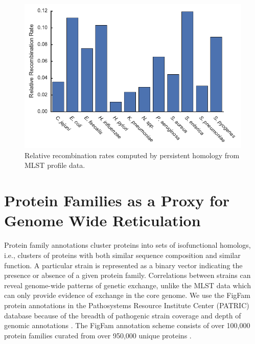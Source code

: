 \begin{figure}
\centering
\includegraphics[width=\textwidth]{./fig/pathogen_barchart.pdf}
\caption[Core genome reticulation patterns in pathogenic bacteria from MLST profiles]{Relative recombination rates computed by persistent homology from MLST profile data.}
\label{fig:pathogen_barchart}
\end{figure}

\section{Protein Families as a Proxy for Genome Wide Reticulation}
\label{pathogens:patric_analysis}

Protein family annotations cluster proteins into sets of isofunctional homologs, i.e., clusters of proteins with both similar sequence composition and similar function.
A particular strain is represented as a binary vector indicating the presence or absence of a given protein family.
Correlations between strains can reveal genome-wide patterns of genetic exchange, unlike the MLST data which can only provide evidence of exchange in the core genome.
We use the FigFam protein annotations in the Pathosystems Resource Institute Center (PATRIC) database because of the breadth of pathogenic strain coverage and depth of genomic annotations \cite{Wattam:2013jy}.
The FigFam annotation scheme consists of over 100,000 protein families curated from over 950,000 unique proteins \cite{Meyer:2009iq}.

